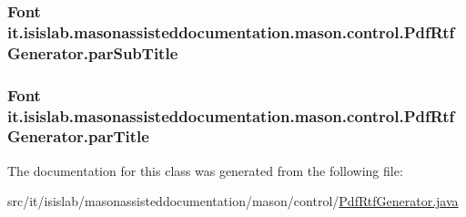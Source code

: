 \hypertarget{classit_1_1isislab_1_1masonassisteddocumentation_1_1mason_1_1control_1_1_pdf_rtf_generator_ae31536bac40b23df15fbb252e60c03bb}{
\subsubsection[{par\-Sub\-Title}]{\setlength{\rightskip}{0pt plus 5cm}Font it.\-isislab.\-masonassisteddocumentation.\-mason.\-control.\-Pdf\-Rtf\-Generator.\-par\-Sub\-Title\hspace{0.3cm}{\ttfamily [private]}}}\label{classit_1_1isislab_1_1masonassisteddocumentation_1_1mason_1_1control_1_1_pdf_rtf_generator_ae31536bac40b23df15fbb252e60c03bb}
\hypertarget{classit_1_1isislab_1_1masonassisteddocumentation_1_1mason_1_1control_1_1_pdf_rtf_generator_a3f130f576b5be4a3a82d7c59347c0869}{
\subsubsection[{par\-Title}]{\setlength{\rightskip}{0pt plus 5cm}Font it.\-isislab.\-masonassisteddocumentation.\-mason.\-control.\-Pdf\-Rtf\-Generator.\-par\-Title\hspace{0.3cm}{\ttfamily [private]}}}\label{classit_1_1isislab_1_1masonassisteddocumentation_1_1mason_1_1control_1_1_pdf_rtf_generator_a3f130f576b5be4a3a82d7c59347c0869}


The documentation for this class was generated from the following file\-:\begin{DoxyCompactItemize}
\item 
src/it/isislab/masonassisteddocumentation/mason/control/\hyperlink{_pdf_rtf_generator_8java}{Pdf\-Rtf\-Generator.\-java}\end{DoxyCompactItemize}
